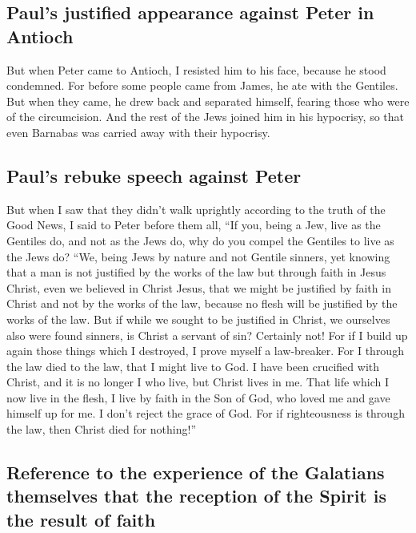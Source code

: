 \hypertarget{pauls-justified-appearance-against-peter-in-antioch}{%
\subsection{Paul's justified appearance against Peter in
Antioch}\label{pauls-justified-appearance-against-peter-in-antioch}}

 But when Peter came to Antioch, I resisted him to his
face, because he stood condemned.  For before some people
came from James, he ate with the Gentiles. But when they came, he drew
back and separated himself, fearing those who were of the circumcision.
 And the rest of the Jews joined him in his hypocrisy, so
that even Barnabas was carried away with their hypocrisy.

\hypertarget{pauls-rebuke-speech-against-peter}{%
\subsection{Paul's rebuke speech against
Peter}\label{pauls-rebuke-speech-against-peter}}

 But when I saw that they didn't walk uprightly according
to the truth of the Good News, I said to Peter before them all, ``If
you, being a Jew, live as the Gentiles do, and not as the Jews do, why
do you compel the Gentiles to live as the Jews do?  ``We,
being Jews by nature and not Gentile sinners,  yet
knowing that a man is not justified by the works of the law but through
faith in Jesus Christ, even we believed in Christ Jesus, that we might
be justified by faith in Christ and not by the works of the law, because
no flesh will be justified by the works of the law.  But
if while we sought to be justified in Christ, we ourselves also were
found sinners, is Christ a servant of sin? Certainly not!
 For if I build up again those things which I destroyed,
I prove myself a law-breaker.  For I through the law died
to the law, that I might live to God.  I have been
crucified with Christ, and it is no longer I who live, but Christ lives
in me. That life which I now live in the flesh, I live by faith in the
Son of God, who loved me and gave himself up for me.  I
don't reject the grace of God. For if righteousness is through the law,
then Christ died for nothing!''

\hypertarget{reference-to-the-experience-of-the-galatians-themselves-that-the-reception-of-the-spirit-is-the-result-of-faith}{%
\subsection{Reference to the experience of the Galatians themselves that
the reception of the Spirit is the result of
faith}\label{reference-to-the-experience-of-the-galatians-themselves-that-the-reception-of-the-spirit-is-the-result-of-faith}}

